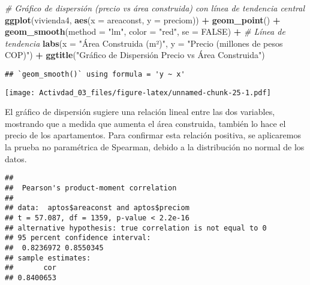 \documentclass[
]{article}
\newenvironment{Shaded}{\begin{snugshade}}{\end{snugshade}}
\newcommand{\AttributeTok}[1]{\textcolor[rgb]{0.13,0.29,0.53}{#1}}
\newcommand{\CommentTok}[1]{\textcolor[rgb]{0.56,0.35,0.01}{\textit{#1}}}
\newcommand{\ConstantTok}[1]{\textcolor[rgb]{0.56,0.35,0.01}{#1}}
\newcommand{\FunctionTok}[1]{\textcolor[rgb]{0.13,0.29,0.53}{\textbf{#1}}}
\newcommand{\NormalTok}[1]{#1}
\newcommand{\SpecialCharTok}[1]{\textcolor[rgb]{0.81,0.36,0.00}{\textbf{#1}}}
\newcommand{\StringTok}[1]{\textcolor[rgb]{0.31,0.60,0.02}{#1}}
\begin{document}
\begin{Shaded}
\begin{Highlighting}[]
\CommentTok{\# Gráfico de dispersión (precio vs área construida) con línea de tendencia central}
\FunctionTok{ggplot}\NormalTok{(vivienda4, }\FunctionTok{aes}\NormalTok{(}\AttributeTok{x =}\NormalTok{ areaconst, }\AttributeTok{y =}\NormalTok{ preciom)) }\SpecialCharTok{+}
  \FunctionTok{geom\_point}\NormalTok{() }\SpecialCharTok{+}
  \FunctionTok{geom\_smooth}\NormalTok{(}\AttributeTok{method =} \StringTok{"lm"}\NormalTok{, }\AttributeTok{color =} \StringTok{"red"}\NormalTok{, }\AttributeTok{se =} \ConstantTok{FALSE}\NormalTok{) }\SpecialCharTok{+}  \CommentTok{\# Línea de tendencia}
  \FunctionTok{labs}\NormalTok{(}\AttributeTok{x =} \StringTok{"Área Construida (m²)"}\NormalTok{, }\AttributeTok{y =} \StringTok{"Precio (millones de pesos COP)"}\NormalTok{) }\SpecialCharTok{+}
  \FunctionTok{ggtitle}\NormalTok{(}\StringTok{"Gráfico de Dispersión Precio vs Área Construida"}\NormalTok{)}
\end{Highlighting}
\end{Shaded}

\begin{verbatim}
## `geom_smooth()` using formula = 'y ~ x'
\end{verbatim}

\texttt{[image: Activdad\_03\_files/figure-latex/unnamed-chunk-25-1.pdf]}

El gráfico de dispersión sugiere una relación lineal entre las dos
variables, mostrando que a medida que aumenta el área construida,
también lo hace el precio de los apartamentos. Para confirmar esta
relación positiva, se aplicaremos la prueba no paramétrica de Spearman,
debido a la distribución no normal de los datos.

\begin{Shaded}
\end{Shaded}

\begin{verbatim}
## 
##  Pearson's product-moment correlation
## 
## data:  aptos$areaconst and aptos$preciom
## t = 57.087, df = 1359, p-value < 2.2e-16
## alternative hypothesis: true correlation is not equal to 0
## 95 percent confidence interval:
##  0.8236972 0.8550345
## sample estimates:
##       cor 
## 0.8400653
\end{verbatim}
\end{document}
